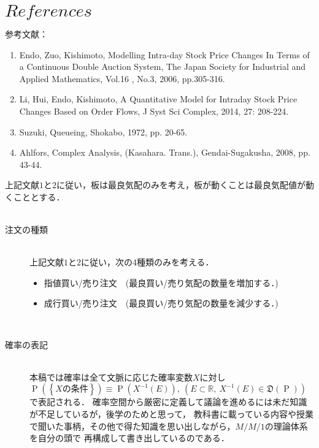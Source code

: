 \documentclass[a4j,papersize,disablejfam,slide,14pt]{jsarticle}
\def\prob#1{\operatorname{P} \left(\left\{ #1 \right\}\right)} %
\begin{document}
\section{$References$}
	参考文献：
    \begin{enumerate}
        \item Endo, Zuo, Kishimoto, 
        Modelling Intra-day Stock Price Changes In Terms of
        a Continuous Double Auction System, 
        The Japan Society for Industrial and Applied Mathematics, 
        Vol.16 , No.3, 2006, pp.305-316.
        \item Li, Hui, Endo, Kishimoto, A Quantitative Model for Intraday Stock Price
         Changes Based on Order Flows, 
         J Syst Sci Complex, 2014, 27: 208-224.
         \item Suzuki, Queueing, Shokabo, 1972, pp. 20-65.
         \item Ahlfors, Complex Analysis, (Kasahara. Trans.), Gendai-Sugakusha, 2008, pp. 43-44.
    \end{enumerate}
    上記文献$1$と$2$に従い，板は最良気配のみを考え，板が動くことは最良気配値が動くこととする．\\\\
    \begin{description}
    	\item[注文の種類]\mbox{}\\
     	上記文献$1$と$2$に従い，次の4種類のみを考える．
    	\begin{itemize}
    		\item 指値買い/売り注文　(最良買い/売り気配の数量を増加する．)
        	\item 成行買い/売り注文　(最良買い/売り気配の数量を減少する．)
    	\end{itemize}
        \mbox{}\\
        \item[確率の表記]\mbox{}\\
        	本稿では確率は全て文脈に応じた確率変数$X$に対し$\prob{\mbox{$X$の条件}} \equiv \operatorname{P}(X^{-1}(E)),
            \ (E \subset \mathbb{R},\ X^{-1}(E) \in \mathfrak{D}(\operatorname{P}))$で表記される．
            確率空間から厳密に定義して議論を進めるには未だ知識が不足しているが，後学のためと思って，
            教科書に載っている内容や授業で聞いた事柄，その他で得た知識を思い出しながら，$M/M/1$の理論体系を自分の頭で
            再構成して書き出しているのである．
     \end{description}
\end{document}
